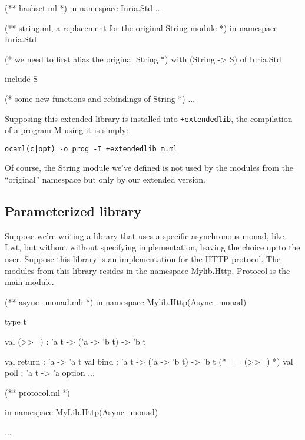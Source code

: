 \documentclass[11pt,a4paper]{article}
\begin{document}
\begin{OCaml}
(** hashset.ml *)
in namespace Inria.Std
...
\end{OCaml}

\begin{OCaml}
(** string.ml, a replacement for the original String module *)
in namespace Inria.Std

(* we need to first alias the original String *)
  with (String -> S) of Inria.Std

include S

(* some new functions and rebindings of String *)
...
\end{OCaml}

Supposing this extended library is installed into \texttt{+extendedlib}, the
compilation of a program M using it is simply:
\begin{verbatim}
ocaml(c|opt) -o prog -I +extendedlib m.ml
\end{verbatim}

Of course, the String module we've defined is not used by the modules from the
``original'' namespace but only by our extended version.

\subsection{Parameterized library}

Suppose we're writing a library that uses a specific asynchronous monad, like
Lwt, but without without specifying implementation, leaving the choice up to the
user. Suppose this library is an implementation for the HTTP protocol. The modules
from this library resides in the namespace Mylib.Http. Protocol is the main module.

\begin{OCaml}
(** async_monad.mli *)
in namespace Mylib.Http(Async_monad)

type t

val (>>=) : 'a t -> ('a -> 'b t) -> 'b t

val return : 'a -> 'a t
val bind : 'a t -> ('a -> 'b t) -> 'b t (* == (>>=) *)
val poll : 'a t -> 'a option
...
\end{OCaml}

\medskip

\begin{OCaml}
(** protocol.ml *)

in namespace MyLib.Http(Async_monad)

...
\end{OCaml}
\end{document}
